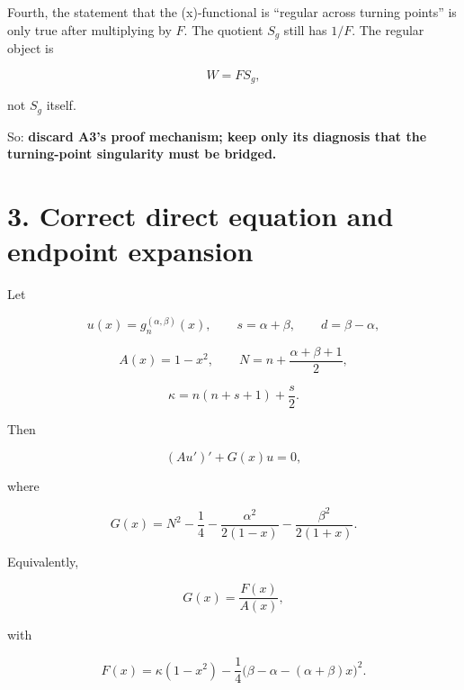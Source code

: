 \documentclass[11pt]{article}
\begin{document}
Fourth, the statement that the (x)-functional is ``regular across turning points'' is only true after multiplying by \(F\). The quotient \(S_g\) still has \(1/F\). The regular object is

\begin{equation*}
W=F S_g,
\end{equation*}


not \(S_g\) itself.

So: \textbf{discard A3's proof mechanism; keep only its diagnosis that the turning-point singularity must be bridged.}



\section*{3. Correct direct equation and endpoint expansion}

Let

\begin{equation*}
u(x)=g_n^{(\alpha,\beta)}(x),
\qquad
s=\alpha+\beta,
\qquad
d=\beta-\alpha,
\end{equation*}


\begin{equation*}
A(x)=1-x^2,
\qquad
N=n+\frac{\alpha+\beta+1}{2},
\end{equation*}


\begin{equation*}
\kappa=n(n+s+1)+\frac{s}{2}.
\end{equation*}


Then

\begin{equation*}
\boxed{
(Au')'+G(x)u=0,
}
\tag{4}
\end{equation*}


where

\begin{equation*}
\boxed{
G(x)=
N^2-\frac14
-\frac{\alpha^2}{2(1-x)}
-\frac{\beta^2}{2(1+x)}.
}
\tag{5}
\end{equation*}


Equivalently,

\begin{equation*}
G(x)=\frac{F(x)}{A(x)},
\end{equation*}


with

\begin{equation*}
\boxed{
F(x)
=
\kappa(1-x^2)
-\frac14\bigl(\beta-\alpha-(\alpha+\beta)x\bigr)^2.
}
\tag{6}
\end{equation*}
\end{document}
